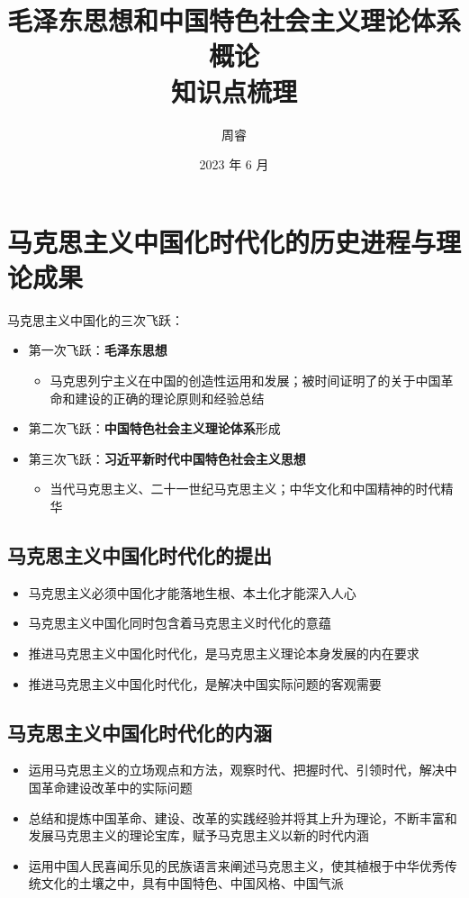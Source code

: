 \documentclass[12pt,openany]{ctexbook}
\title{\bfseries 毛泽东思想和中国特色社会主义理论体系概论\\[2pt]\large 知识点梳理}
\author{周睿}
\date{2023 年 6 月}
\begin{document}
\frontmatter
\maketitle
\tableofcontents
\mainmatter
\chapter{马克思主义中国化时代化的历史进程与理论成果}
马克思主义中国化的三次飞跃：
\begin{itemize}
  \item 第一次飞跃：\textbf{毛泽东思想}
\begin{itemize}
  \item 马克思列宁主义在中国的创造性运用和发展；被时间证明了的关于中国革命和建设的正确的理论原则和经验总结
\end{itemize}
  \item 第二次飞跃：\textbf{中国特色社会主义理论体系}形成
  \item 第三次飞跃：\textbf{习近平新时代中国特色社会主义思想}
\begin{itemize}
  \item 当代马克思主义、二十一世纪马克思主义；中华文化和中国精神的时代精华
\end{itemize}
\end{itemize}
\section{马克思主义中国化时代化的提出}
\begin{itemize}
  \item 马克思主义必须中国化才能落地生根、本土化才能深入人心
  \item 马克思主义中国化同时包含着马克思主义时代化的意蕴
  \item 推进马克思主义中国化时代化，是马克思主义理论本身发展的内在要求
  \item 推进马克思主义中国化时代化，是解决中国实际问题的客观需要
\end{itemize}
\section{马克思主义中国化时代化的内涵}
\begin{itemize}
  \item 运用马克思主义的立场观点和方法，观察时代、把握时代、引领时代，解决中国革命建设改革中的实际问题
  \item 总结和提炼中国革命、建设、改革的实践经验并将其上升为理论，不断丰富和发展马克思主义的理论宝库，赋予马克思主义以新的时代内涵
  \item 运用中国人民喜闻乐见的民族语言来阐述马克思主义，使其植根于中华优秀传统文化的土壤之中，具有中国特色、中国风格、中国气派
\end{itemize}
\end{document}
